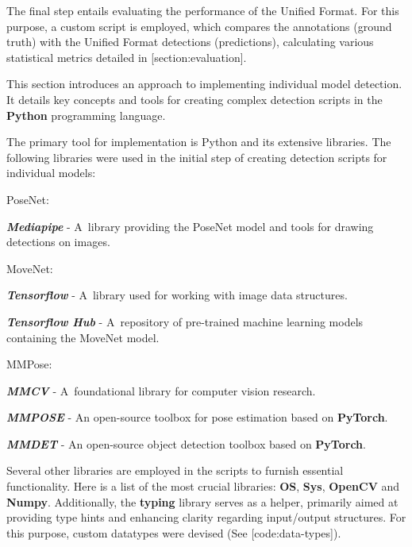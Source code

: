 The final step entails evaluating the performance of the Unified Format. For this purpose, a custom script is employed, which compares the annotations (ground truth) with the Unified Format detections (predictions), calculating various statistical metrics detailed in [section:evaluation].

This section introduces an approach to implementing individual model detection. It details key concepts and tools for creating complex detection scripts in the {\bf Python} programming language.

The primary tool for implementation is Python and its extensive libraries. The following libraries were used in the initial step of creating detection scripts for individual models:

\startitemize[n]
    \item PoseNet:
        \startitemize[1]
            \item {\bf {\em Mediapipe}} - A~library providing the PoseNet model and tools for drawing detections on images.
        \stopitemize
    \item MoveNet:
        \startitemize[1]
            \item {\bf {\em Tensorflow}} - A~library used for working with image data structures.
            \item {\bf {\em Tensorflow Hub}} - A~repository of pre-trained machine learning models containing the MoveNet model.
        \stopitemize
    \item MMPose:
        \startitemize[1]
            \item {\bf {\em MMCV}} - A~foundational library for computer vision research.
            \item {\bf {\em MMPOSE}} - An open-source toolbox for pose estimation based on {\bf PyTorch}.
            \item {\bf {\em MMDET}} - An open-source object detection toolbox based on {\bf PyTorch}.
        \stopitemize
\stopitemize

Several other libraries are employed in the scripts to furnish essential functionality. Here is a list of the most crucial libraries: {\bf OS}, {\bf Sys}, {\bf OpenCV} and {\bf Numpy}. Additionally, the {\bf typing} library serves as a helper, primarily aimed at providing type hints and enhancing clarity regarding input/output structures. For this purpose, custom datatypes were devised (See [code:data-types]).

